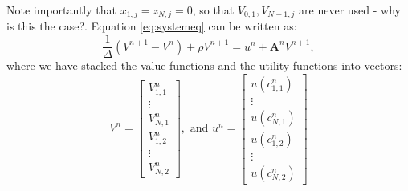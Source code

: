 \documentclass[12pt]{article}
\DeclareMathOperator{\1}{\mathbbm{1}}
\begin{document}
Note importantly that $x_{1,j}=z_{N,j}=0$, so that $V_{0,1},V_{N+1,j}$ are never used - {\color{red} why is this the case?}. Equation \eqref{eq:systemeq} can be written as:
\begin{equation}
\frac{1}{\Delta} (V^{n+1} - V^n) + \rho V^{n+1} = u^n + \mathbf{A}^nV^{n+1},
\end{equation}
where we have stacked the value functions and the utility functions into vectors:
	\begin{equation*}
	V^{n}=\begin{bmatrix}
	V^n_{1,1} \\ 
	 \vdots \\
	V^n_{N,1} \\
	V^n_{1,2} \\
	\vdots \\
	V^n_{N,2}
	\end{bmatrix}, \text{ and } u^n=\begin{bmatrix}
	u(c^n_{1,1}) \\ 
	 \vdots \\
	u(c^n_{N,1}) \\
	u(c^n_{1,2}) \\
	\vdots \\
	u(c^n_{N,2})
	\end{bmatrix}
	\end{equation*}
\end{document}
